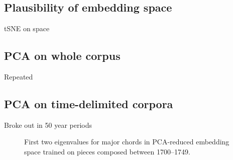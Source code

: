 \subsection{Plausibility of embedding space}
tSNE on space
\subsection{PCA on whole corpus}
Repeated 
\subsection{PCA on time-delimited corpora}
Broke out in 50 year periods

\begin{figure}
 \centerline{}
 \caption{First two eigenvalues for major chords in PCA-reduced embedding space trained on pieces composed between 1700--1749.}
 \label{fig:1700_majors}
\end{figure}

